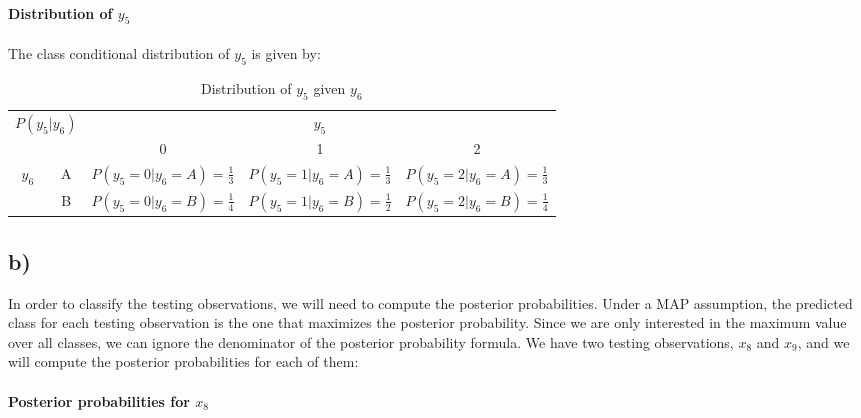 \documentclass{article}
\begin{document}
\paragraph{Distribution of $y_5$}
\paragraph{}

The class conditional distribution of $y_5$ is given by:

\begin{table}[h!]
\centering
\begin{tabular}{|cc|ccc|}
\hline
\multicolumn{2}{|c|}{\multirow{2}{*}{$P(y_5|y_6)$}} & \multicolumn{3}{c|}{$y_5$}                                                                                                        \\ \cline{3-5} 
\multicolumn{2}{|c|}{}                              & \multicolumn{1}{c|}{0}                           & \multicolumn{1}{c|}{1}                           & 2                           \\ \hline
\multicolumn{1}{|c|}{\multirow{2}{*}{$y_6$}}   & A  & \multicolumn{1}{c|}{$P(y_5=0|y_6=A) =\frac{1}{3}$} & \multicolumn{1}{c|}{$P(y_5=1|y_6=A) =\frac{1}{3}$} & $P(y_5=2|y_6=A) =\frac{1}{3}$ \\ \cline{2-5} 
\multicolumn{1}{|c|}{}                         & B  & \multicolumn{1}{c|}{$P(y_5=0|y_6=B) =\frac{1}{4}$} & \multicolumn{1}{c|}{$P(y_5=1|y_6=B) =\frac{1}{2}$} & $P(y_5=2|y_6=B) =\frac{1}{4}$ \\ \hline
\end{tabular}
\caption{Distribution of $y_5$ given $y_6$}
\end{table}

\subsection*{b)}

In order to classify the testing observations, we will need to compute the posterior probabilities. 
Under a MAP assumption, the predicted class for each testing observation is the one that maximizes the posterior probability.
Since we are only interested in the maximum value over all classes, we can ignore the denominator of the posterior probability formula.
We have two testing observations, $x_8$ and $x_9$, and we will compute the posterior probabilities for each of them:

\paragraph{Posterior probabilities for $x_8$}
\end{document}
